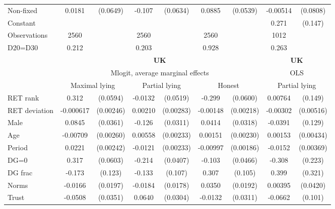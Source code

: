 \begin{tabular}{l|cccccc|cc}
Non-fixed     &   0.0181         & (0.0649)&   -0.107\sym{*}  & (0.0634)&   0.0885         & (0.0539)& -0.00514         & (0.0808)\\
Constant        &                  &         &                  &         &                  &         &    0.271\sym{*}  &  (0.147)\\
\hline
Observations    &     2560         &         &     2560         &         &     2560         &         &     1012         &         \\
D20=D30         &    0.212         &         &    0.203         &         &    0.928         &         &    0.263         &         \\
\hline\hline
&\multicolumn{6}{c|}{\bf UK}&\multicolumn{2}{c}{\bf UK}\\ &\multicolumn{6}{c|}{Mlogit, average marginal effects }&\multicolumn{2}{c}{OLS}\\
                &\multicolumn{2}{c}{Maximal lying}&\multicolumn{2}{c}{Partial lying}&\multicolumn{2}{c|}{Honest}  &\multicolumn{2}{c}{Partial lying}\\
\hline
RET rank        &    0.312\sym{***}& (0.0594)&  -0.0132         & (0.0519)&   -0.299\sym{***}& (0.0600)&  0.00764         &  (0.149)\\
RET deviation   &-0.000617         &(0.00246)&  0.00210         &(0.00283)& -0.00148         &(0.00218)& -0.00302         &(0.00516)\\
Male            &   0.0845\sym{**} & (0.0361)&   -0.126\sym{***}& (0.0311)&   0.0414         & (0.0318)&  -0.0391         &  (0.129)\\
Age             & -0.00709\sym{***}&(0.00260)&  0.00558\sym{**} &(0.00233)&  0.00151         &(0.00230)&  0.00153         &(0.00434)\\
Period          &   0.0221\sym{***}&(0.00242)&  -0.0121\sym{***}&(0.00233)& -0.00997\sym{***}&(0.00186)&  -0.0152\sym{***}&(0.00369)\\
DG=0          &    0.317\sym{***}& (0.0603)&   -0.214\sym{***}& (0.0407)&   -0.103\sym{**} & (0.0466)&   -0.308         &  (0.223)\\
DG frac         &   -0.173         &  (0.123)&   -0.133         &  (0.107)&    0.307\sym{***}&  (0.105)&    0.399         &  (0.321)\\
Norms           &  -0.0166         & (0.0197)&  -0.0184         & (0.0178)&   0.0350\sym{*}  & (0.0192)&  0.00395         & (0.0420)\\
Trust         &  -0.0508         & (0.0351)&   0.0640\sym{**} & (0.0304)&  -0.0132         & (0.0311)&  -0.0662         &  (0.101)\\

\end{tabular}
